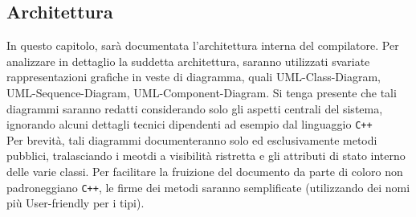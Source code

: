 \subsection{Architettura}
In questo capitolo, sarà documentata l'architettura interna del compilatore. Per 
analizzare in dettaglio la suddetta architettura, saranno utilizzati svariate rappresentazioni grafiche 
in veste di diagramma, quali UML-Class-Diagram, UML-Sequence-Diagram, UML-Component-Diagram. Si tenga presente che tali
diagrammi saranno redatti considerando solo gli aspetti centrali del sistema, ignorando alcuni dettagli tecnici
dipendenti ad esempio dal linguaggio \texttt{C++} \\

Per brevità, tali diagrammi documenteranno solo ed esclusivamente metodi pubblici, tralasciando i meotdi
a visibilità ristretta e gli attributi di stato interno delle varie classi. Per facilitare la fruizione del documento
da parte di coloro non padroneggiano \texttt{C++}, le firme dei metodi saranno semplificate (utilizzando dei nomi più 
User-friendly per i tipi).\\

